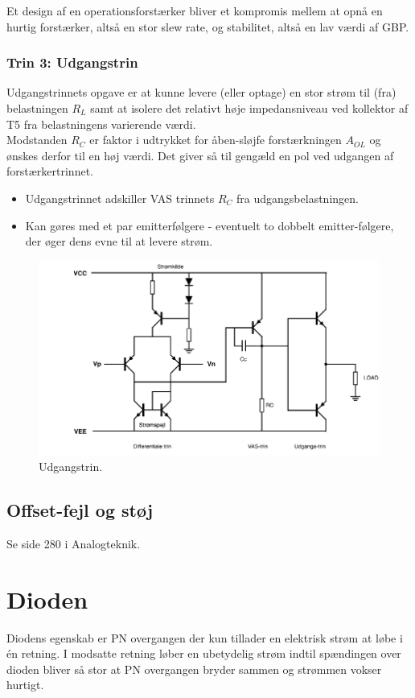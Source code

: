 \documentclass[danish]{article}
\begin{document}
Et design af en operationsforstærker bliver et kompromis mellem at opnå en hurtig forstærker, altså en stor slew rate, og stabilitet, altså en lav værdi af GBP. 

\subsubsection{Trin 3: Udgangstrin} 
Udgangstrinnets opgave er at kunne levere (eller optage) en stor strøm til (fra) belastningen $R_L$ samt at isolere det relativt høje impedansniveau ved kollektor af T5 fra belastningens varierende værdi.\\

Modstanden $R_C$ er faktor i udtrykket for åben-sløjfe forstærkningen $A_{OL}$ og ønskes derfor til en høj værdi. Det giver så til gengæld en pol ved udgangen af forstærkertrinnet.

\begin{itemize}
	\item Udgangstrinnet adskiller VAS trinnets $R_C$ fra udgangsbelastningen.
	\item Kan gøres med et par emitterfølgere - eventuelt to dobbelt emitter-følgere, der øger dens evne til at levere strøm.
\end{itemize}

\begin{figure} [H]
	\centering
	\includegraphics[width=0.85\linewidth]{graphics/udgangstrin}
	\caption{Udgangstrin.}
	\label{fig:udgangstrin}
\end{figure}

\subsection{Offset-fejl og støj}
Se side 280 i Analogteknik.
\newpage
\section{Dioden}
Diodens egenskab er PN overgangen der kun tillader en elektrisk strøm at løbe i én retning. 
I modsatte retning løber en ubetydelig strøm indtil spændingen over dioden bliver så stor at PN overgangen bryder sammen og strømmen vokser hurtigt.
\end{document}
